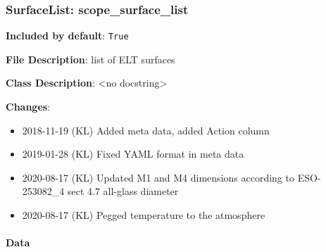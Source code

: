 \subsubsection{SurfaceList: \textquotedbl{}scope\_surface\_list\textquotedbl{}%
  \label{surfacelist-scope-surface-list}%
}

\textbf{Included by default}: \texttt{True}

\textbf{File Description}: list of ELT surfaces

\textbf{Class Description}: <no docstring>

\textbf{Changes}:

\begin{itemize}
\item 2018-11-19 (KL) Added meta data, added Action column

\item 2019-01-28 (KL) Fixed YAML format in meta data

\item 2020-08-17 (KL) Updated M1 and M4 dimensions according to ESO-253082\_4 sect 4.7 \textquotedbl{}all-glass\textquotedbl{} diameter

\item 2020-08-17 (KL) Pegged temperature to the atmosphere
\end{itemize}


\paragraph{Data%
  \label{data}%
}

\begin{figure}[H]
\noindent{}\label{fig-scope-surface-list}
\end{figure}

